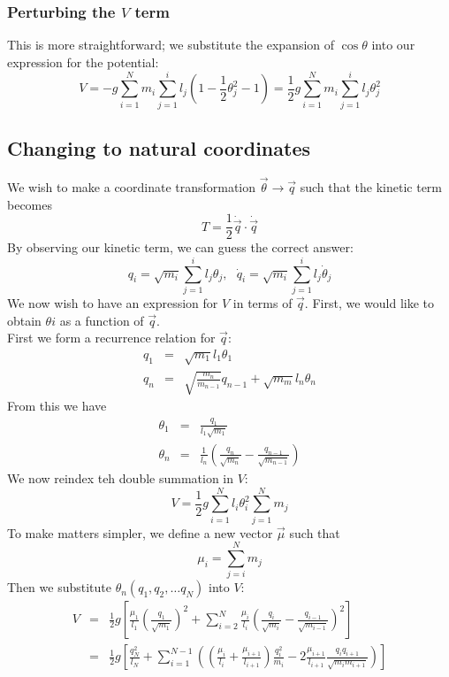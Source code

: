 \documentclass[12pt]{article}
\begin{document}
	\subsubsection{Perturbing the $V$ term}
	This is more straightforward; we substitute the expansion of $\cos{\theta}$ into our expression for the potential:
	$$V=-g\sum_{i=1}^N m_i\sum_{j=1}^i l_j\left(1-\frac{1}{2}\theta_j^2-1\right)=\frac{1}{2}g\sum_{i=1}^N m_i\sum_{j=1}^i l_j\theta_j^2$$
	
	\subsection{Changing to natural coordinates}
	We wish to make a coordinate transformation $\vec{\theta}\rightarrow\vec{q}$ such that the kinetic term becomes
	$$T=\frac{1}{2}\dot{\vec{q}}\cdot\dot{\vec{q}}$$
	By observing our kinetic term, we can guess the correct answer:
	$$q_i = \sqrt{m_i}\sum_{j=1}^il_j\theta_j,\mbox{ }\dot{q}_i = \sqrt{m_i}\sum_{j=1}^il_j\dot{\theta}_j$$
	We now wish to have an expression for $V$ in terms of $\vec{q}$. First, we would like to obtain $\theta{i}$ as a function of $\vec{q}$.\\
	First we form a recurrence relation for $\vec{q}$:
	\begin{eqnarray*}
	q_1 &=& \sqrt{m_1}l_1\theta_1\\
	q_n &=& \sqrt{\frac{m_n}{m_{n-1}}}q_{n-1} + \sqrt{m_m}l_n\theta_n
	\end{eqnarray*}
	From this we have
	\begin{eqnarray*}
	\theta_1 &=& \frac{q_1}{l_1\sqrt{m_1}}\\
	\theta_n &=& \frac{1}{l_n}\left(\frac{q_n}{\sqrt{m_n}}-\frac{q_{n-1}}{\sqrt{m_{n-1}}}\right)
	\end{eqnarray*}
	We now reindex teh double summation in $V$:
	$$V=\frac{1}{2}g\sum_{i=1}^Nl_i\theta_i^2\sum_{j=1}^Nm_j$$
	To make matters simpler, we define a new vector $\vec{\mu}$ such that
	$$\mu_i=\sum_{j=i}^Nm_j$$
	Then we substitute $\theta_n(q_1, q_2,\dots q_N)$ into $V$:
	\begin{eqnarray*}		
	V&=&\frac{1}{2}g\left[\frac{\mu_1}{l_1}\left(\frac{q_1}{\sqrt{m_1}}\right)^2+\sum_{i=2}^N\frac{\mu_i}{l_i}\left(\frac{q_i}{\sqrt{m_i}}-\frac{q_{i-1}}{\sqrt{m_{i-1}}}\right)^2\right]\\
	&=&\frac{1}{2}g\left[\frac{q_N^2}{l_N}+\sum_{i=1}^{N-1}\left(\left(\frac{\mu_i}{l_i}+\frac{\mu_{i+1}}{l_{i+1}}\right)\frac{q_i^2}{m_i}-2\frac{\mu_{i+1}}{l_{i+1}}\frac{q_iq_{i+1}}{\sqrt{m_im_{i+1}}}\right)\right]
	\end{eqnarray*}
	
\end{document}
